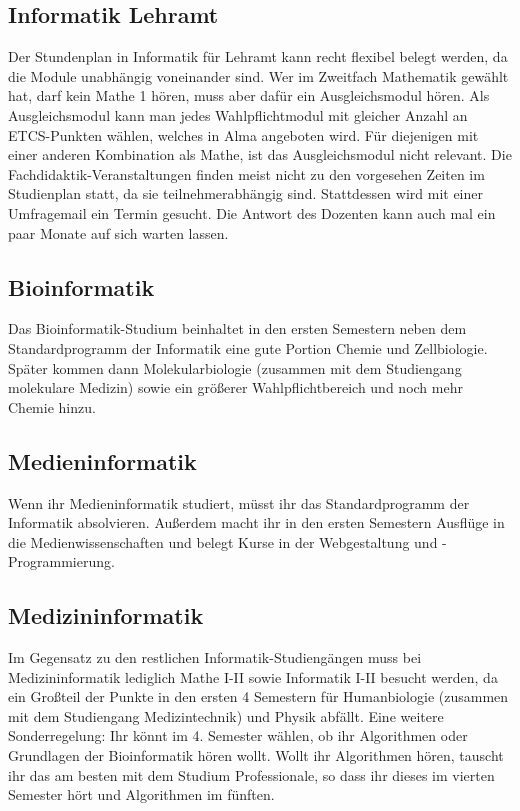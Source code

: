\subsection*{Informatik Lehramt}
	
Der Stundenplan in Informatik für Lehramt kann recht flexibel belegt werden, da
die Module unabhängig voneinander sind. Wer im Zweitfach Mathematik gewählt
hat, darf kein Mathe 1 hören, muss aber dafür ein Ausgleichsmodul hören. Als
Ausgleichsmodul kann man jedes Wahlpflichtmodul mit gleicher Anzahl an
ETCS-Punkten wählen, welches in Alma angeboten wird. Für diejenigen mit einer
anderen Kombination als Mathe, ist das Ausgleichsmodul nicht relevant. Die
Fachdidaktik-Veranstaltungen finden meist nicht zu den vorgesehen Zeiten im
Studienplan statt, da sie teilnehmerabhängig sind. Stattdessen wird mit einer
Umfragemail ein Termin gesucht. Die Antwort des Dozenten kann auch mal ein paar
Monate auf sich warten lassen.

\subsection*{Bioinformatik}
	
Das Bioinformatik-Studium beinhaltet in den ersten Semestern neben dem
Standardprogramm der Informatik eine gute Portion Chemie und Zellbiologie.
Später kommen dann Molekularbiologie (zusammen mit dem Studiengang molekulare
Medizin) sowie ein größerer Wahlpflichtbereich und noch mehr Chemie hinzu.

\subsection*{Medieninformatik}
	
Wenn ihr Medieninformatik studiert, müsst ihr das Standardprogramm der
Informatik absolvieren. Außerdem macht ihr in den ersten Semestern Ausflüge in
die Medienwissenschaften und belegt Kurse in der Webgestaltung und
-Programmierung.

\pagebreak 
\subsection*{Medizininformatik}
	
Im Gegensatz zu den restlichen Informatik-Studiengängen muss bei
Medizininformatik lediglich Mathe I-II sowie Informatik I-II besucht werden, da
ein Großteil der Punkte in den ersten 4 Semestern für Humanbiologie (zusammen
mit dem Studiengang Medizintechnik) und Physik abfällt. Eine weitere
Sonderregelung: Ihr könnt im 4. Semester wählen, ob ihr Algorithmen oder
Grundlagen der Bioinformatik hören wollt. Wollt ihr Algorithmen hören, tauscht
ihr das am besten mit dem Studium Professionale, so dass ihr dieses im vierten
Semester hört und Algorithmen im fünften.

\vfill
{}
\pagebreak
